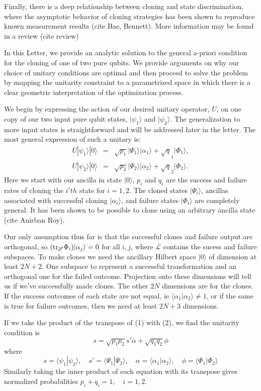 \documentclass[aps,prl,twocolumn,eqsecnum,showpacs]{revtex4}
\newcommand{\tr}{{\rm tr}\,}
\newcommand{\ke}[1]{|#1\rangle}
\newcommand{\bk}[2]{\langle #1|#2\rangle}
\begin{document}
Finally, there is a deep relationship between cloning and state discrimination, where the asymptotic behavior of cloning strategies has been shown to reproduce known measurement results (cite Bae, Bennett). More information may be found in a review (cite review)

In this Letter, we provide an analytic solution to the general a-priori condition for the cloning of one of two pure qubits.  We provide arguments on why our choice of unitary conditions are optimal and then proceed to solve the problem by mapping the unitarity constraint to a parametrized space in which there is a clear geometric interpretation of the optimization process.

We begin by expressing the action of our desired unitary operator, $U$,  on one copy of our two input pure qubit states, $\ke {\psi_1}$ and $\ke {\psi_2}$.  The generalization to more input states is straightforward and will be addressed later in the letter. The most general expression of such a unitary is:
%
\begin{eqnarray}
U|\psi_1\rangle|0\rangle&=& \sqrt{p_1}|\Psi_1\rangle|\alpha_1\rangle +\sqrt q_1 |\Phi_1\rangle,\\
U|\psi_2\rangle|0\rangle&=& \sqrt{p_2}|\Psi_2\rangle|\alpha_2\rangle +\sqrt q_2 |\Phi_2\rangle.
\end{eqnarray}
%
Here we start with our ancilla in state $\ke 0$, $p_i$ and $q_i$ are the success and failure rates of cloning the $i'th$ state for $i = 1,2$.  The cloned states $\ke {\Psi_i}$, ancillas associated with successful cloning $\ke {\alpha_i}$, and failure states $\ke {\Phi_i}$ are completely general.  It has been shown to be possible to clone using an arbitrary ancilla state (cite Anirban Roy). 

Our only assumption thus far is that the successful clones and failure output are orthogonal, so $(\tr_{\!\!\mathscr L}\Phi_i)|\alpha_j\rangle=0$ for all $i,j$, where  $\mathscr L$ contains the sucess and failure subspaces. To make clones we need the ancillary Hilbert space $ \ke 0$ of dimension at least $2N+2$. One subspace to represent a successful transformation and an orthogonal one for the failed outcome.  Projection onto these dimensions will tell us if we've successfully made clones.  The other $2N$ dimensions are for the clones.  If the success outcomes of each state are not equal, ie  $\bk {\alpha_1}{\alpha_2}\neq 1$, or if the same is true for failure outcomes, then we need at least $2N +3$ dimensions.

If we take the product of the transpose of (1) with (2), we find the unitarity condition is
\begin{equation}
s=\sqrt{p_1 p_2} s' \alpha+\sqrt{q_1 q_2}\phi
\end{equation}
where
$$
s = \bk {\psi_1}{\psi_2}, \quad s'=\langle\Psi_1|\Psi_2\rangle,\quad \alpha=\langle\alpha_1|\alpha_2\rangle,\quad \phi=\langle\Phi_1|\Phi_2\rangle
$$
Similarly taking the inner product of each equation with its transpose gives normalized probabilities $p_i+q_i=1,\quad i=1,2.$
\end{document}
